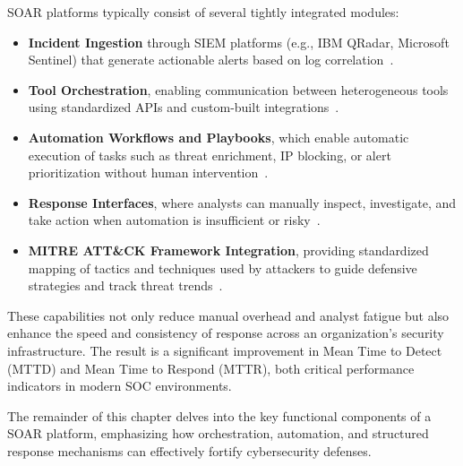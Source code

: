 SOAR platforms typically consist of several tightly integrated modules:
\begin{itemize}[noitemsep,topsep=0pt]
    \item \textbf{Incident Ingestion} through SIEM platforms (e.g., IBM QRadar, Microsoft Sentinel) that generate actionable alerts based on log correlation~\cite{microsoftsiem}.
    \item \textbf{Tool Orchestration}, enabling communication between heterogeneous tools using standardized APIs and custom-built integrations~\cite{techtarget}.
    \item \textbf{Automation Workflows and Playbooks}, which enable automatic execution of tasks such as threat enrichment, IP blocking, or alert prioritization without human intervention~\cite{paloalto}.
    \item \textbf{Response Interfaces}, where analysts can manually inspect, investigate, and take action when automation is insufficient or risky~\cite{techtarget}.
    \item \textbf{MITRE ATT\&CK Framework Integration}, providing standardized mapping of tactics and techniques used by attackers to guide defensive strategies and track threat trends~\cite{mitre}.
\end{itemize}

These capabilities not only reduce manual overhead and analyst fatigue but also enhance the speed and consistency of response across an organization's security infrastructure. The result is a significant improvement in Mean Time to Detect (MTTD) and Mean Time to Respond (MTTR), both critical performance indicators in modern SOC environments.

The remainder of this chapter delves into the key functional components of a SOAR platform, emphasizing how orchestration, automation, and structured response mechanisms can effectively fortify cybersecurity defenses.
